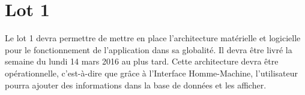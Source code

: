 \section{Lot 1}
	Le lot 1 devra permettre de mettre en place l'architecture matérielle et logicielle pour le fonctionnement de l'application dans sa globalité. Il devra être livré la semaine du lundi 14 mars 2016 au plus tard. Cette architecture devra être opérationnelle, c'est-à-dire que grâce à l'Interface Homme-Machine, l'utilisateur pourra ajouter des informations dans la base de données et les afficher.  